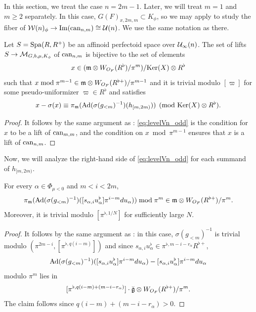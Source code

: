 \documentclass[12pt,reqno]{amsart}
\begin{document}
In this section, we treat the case $n = 2m - 1$. Later, we will treat $m = 1$ and $m \geq 2$ separately. In this case, $G(F)_{x, 2m, m} \subset K_{\phi}$, so we may apply  to study the fiber of ${\mathcal{W}}(n)_{\phi} \to {\operatorname{Im}}({\operatorname{can}}_{n, m}) \cong {\mathcal{U}}(n)$. We use the same notation as there. 

\begin{prop} \label{lem:levelVn_odd}
    Let $S = {\operatorname{Spa}}(R,R^+)$ be an affinoid perfectoid space over ${\mathcal{U}}_\infty(n)$. The set of lifts $S \to {\mathcal{M}}_{G, b, \mu, K_\phi}$ of ${\operatorname{can}}_{n, m}$ is bijective to the set of elements
    \[
        x \in ({\mathfrak{m}} \otimes W_{O_F}(R^\flat) / \pi^m) / {\operatorname{Ker}}(X) \otimes R^\flat
    \]
    such that $x \bmod \pi^{m - 1} \in {\mathfrak{m}} \otimes W_{O_F}(R^{\flat+}) / \pi^{m - 1}$ and it is trivial modulo $[\varpi]$ for some pseudo-uniformizer $\varpi \in R^\flat$ and satisfies
    \begin{equation} \label{eq:levelVn_odd}
        x - \sigma(x) \equiv \pi_{{\mathfrak{m}}}({\operatorname{Ad}}(\sigma(g_{<m})^{-1})(h_{[m, 2m)})) \pmod{{\operatorname{Ker}}(X) \otimes R^{\flat}}. 
    \end{equation}
\end{prop}
\begin{proof}
    It follows by the same argument as : \eqref{eq:levelVn_odd} is the condition for $x$ to be a lift of ${\operatorname{can}}_{m, m}$, and the condition on $x \bmod \pi^{m-1}$ ensures that $x$ is a lift of ${\operatorname{can}}_{n, m}$. 
\end{proof}

Now, we will analyze the right-hand side of \eqref{eq:levelVn_odd} for each summand of $h_{[m, 2m)}$. 

\begin{lem} \label{lem:computepit_odd}
    For every $\alpha \in \Phi_{\mu < 0}$ and $m < i < 2m$, 
    \[
        \pi_{{\mathfrak{m}}}({\operatorname{Ad}}(\sigma(g_{<m})^{-1})([s_{\alpha,i}u_\alpha^\flat]\pi^{i-m}du_\alpha)) \bmod \pi^m \in {\mathfrak{m}}\otimes W_{O_F}(R^{\flat +}) / \pi^m. 
    \]
    Moreover, it is trivial modulo $[\pi^{\flat, 1/N}]$ for sufficiently large $N$. 
\end{lem}
\begin{proof}
    It follows by the same argument as : in this case, $\sigma(g_{<m})^{-1}$ is trivial modulo $(\pi^{2m - i}, [\pi^{\flat, q(i-m)}])$ and since $s_{\alpha,i}u_\alpha^\flat \in \pi^{\flat, m - i - r_{\alpha}} R^{\flat +}$, 
    \[
        {\operatorname{Ad}}(\sigma(g_{<m})^{-1})([s_{\alpha,i}u_\alpha^\flat]\pi^{i-m}du_\alpha) - [s_{\alpha,i}u_\alpha^\flat]\pi^{i-m}du_\alpha 
    \]
    modulo $\pi^m$ lies in 
    \[
        [\pi^{\flat, q(i-m) + (m - i - r_{\alpha})}] \cdot {\mathfrak{\breve{g}}}\otimes W_{O_F}(R^{\flat +})/\pi^{m}. 
    \]
    The claim follows since 
    $
        q(i-m) + (m - i - r_{\alpha}) > 0. 
    $
\end{proof}
\end{document}
